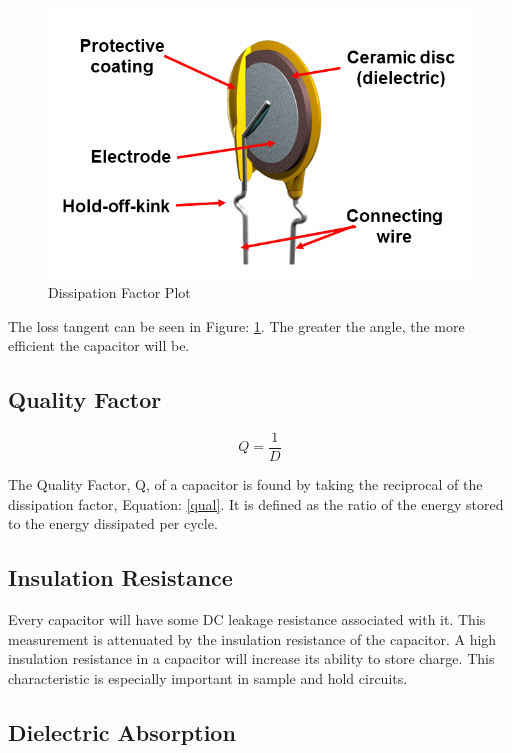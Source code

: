 \begin{figure}
    \includegraphics[keepaspectratio=true,scale=.5]{./figures/testImage.png}
    \centering
    \caption{Dissipation Factor Plot}
    \label{dfPlot}
\end{figure}

The loss tangent can be seen in Figure: \ref{dfPlot}. The greater the angle, the more efficient the capacitor will be.

\subsection{Quality Factor}

\begin{equation}
\label{qual}
Q = \frac{1}{D}
\end{equation}

The Quality Factor, Q, of a capacitor is found by taking the reciprocal of the dissipation factor, Equation: \eqref{qual}. It is defined as the ratio of the energy stored to the energy dissipated per cycle.

\subsection{Insulation Resistance}

Every capacitor will have some DC leakage resistance associated with it. This measurement is attenuated by the insulation resistance of the capacitor. A high insulation resistance in a capacitor will increase its ability to store charge. This characteristic is especially important in sample and hold circuits.

\subsection{Dielectric Absorption}

